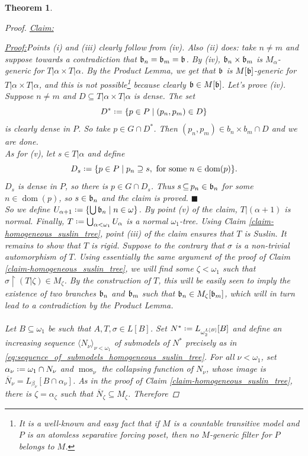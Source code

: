 \documentclass[11pt,a4paper]{report}
\newtheorem{theorem}{Theorem}[chapter] %
\theoremstyle{definition}
\theoremstyle{num.custom-title}
\theoremstyle{custom-title}
\newenvironment{claim}[1]{\par\noindent\underline{Claim#1:}\space}{} %
\newenvironment{claimproof}[1]{\par\noindent\underline{Proof:}\space#1}{\leavevmode\unskip\penalty9999 \hbox{}\nobreak\hfill\quad\hbox{$\blacksquare$}} %
\DeclareMathOperator{\dom}{dom}
\DeclareMathOperator{\sse}{\subseteq}
\DeclareMathOperator{\restr}{\upharpoonright}
\DeclareMathOperator{\mos}{mos}
\newcommand{\ol}{\overline}
\newcommand*{\defeq}{\mathrel{\rlap{%
                     \raisebox{0.3ex}{$\cdot$}}%
                     \raisebox{-0.3ex}{$\cdot$}}%
                     =}
\begin{document}
\begin{theorem}
\begin{proof}
\begin{claim}{}
\begin{claimproof}
Points (i) and (iii) clearly follow from (iv). Also (ii) does: take $n \neq m$  and suppose towards a contradiction that $\mathfrak{b}_n = \mathfrak{b}_m = \mathfrak{b}$. By (iv), $\mathfrak{b}_n \times \mathfrak{b}_m$ is $M_\alpha$-generic for $T|\alpha \times T|\alpha$. By the Product Lemma, we get that $\mathfrak{b}$ is $M[\mathfrak{b}]$-generic for $T|\alpha \times T|\alpha$, and this is not possible\footnote{It is a well-known and easy fact that if $M$ is a countable transitive model and $P$ is an atomless separative forcing poset, then no $M$-generic filter for $P$ belongs to $M$.} because clearly $\mathfrak{b} \in M[\mathfrak{b}]$. Let's prove (iv). Suppose $n \neq m$ and $D \sse T|\alpha \times T|\alpha$ is dense. The set
\[
D^* \defeq \{p \in P \mid (p_n,p_m) \in D\}
\]
is clearly dense in $P$. So take $p \in G \cap D^*$. Then $(p_n,p_m) \in b_n \times b_m \cap D$ and we are done.\\
As for (v), let $s \in T|\alpha$ and define
\[
D_s \defeq \{p \in P \mid p_n \supseteq s, \text{ for some } n \in \dom(p)\}.
\]
$D_s$ is dense in $P$, so there is $p \in G \cap D_s$. Thus $s \sse p_n \in \b_n$ for some $n \in \dom(p)$, so $s \in \mathfrak{b}_n$ and the claim is proved.
\end{claimproof}
\end{claim}\\[10pt]
So we define $U_{\alpha+1} \defeq \{\bigcup \b_n \mid n \in \omega\}$. By point (v) of the claim, $T|(\alpha+1)$ is normal. Finally, $T \defeq \bigcup_{\alpha < \omega_1} U_\alpha$ is a normal $\omega_1$-tree. Using Claim \ref{claim-homogeneous_suslin_tree}, point (iii) of the claim ensures that $T$ is Suslin. It remains to show that $T$ is rigid. Suppose to the contrary that $\sigma$ is a non-trivial automorphism of $T$. Using essentially the same argument of the proof of Claim \ref{claim-homogeneous_suslin_tree}, we will find some $\zeta < \omega_1$ such that $\sigma \restr (T|\zeta) \in M_\zeta$. By the construction of $T$, this will be easily seen to imply the existence of two branches $\mathfrak{b}_n$ and $\mathfrak{b}_m$ such that $\mathfrak{b}_n \in M_\zeta[\mathfrak{b}_m]$, which will in turn lead to a contradiction by the Product Lemma.\\
\\
Let $B \sse \omega_1$ be such that $A, T, \sigma \in L[B]$. Set $N^* \defeq L_{\omega_2^{L[B]}}[B]$ and define an increasing sequence $\langle N_\nu \rangle_{\nu < \omega_1}$ of submodels of $N^*$ precisely as in \eqref{eq:sequence_of_submodels_homogeneous_suslin_tree}. For all $\nu < \omega_1$, set $\alpha_\nu \defeq \omega_1 \cap N_\nu$ and $\mos_\nu$ the collapsing function of $N_\nu$, whose image is $\ol{N}_\nu = L_{\beta_\nu}[B \cap \alpha_\nu]$. As in the proof of Claim \ref{claim-homogeneous_suslin_tree}, there is $\zeta = \alpha_\zeta$ such that $\ol{N}_\zeta \sse M_\zeta$. Therefore

\end{proof}
\end{theorem}
\end{document}
